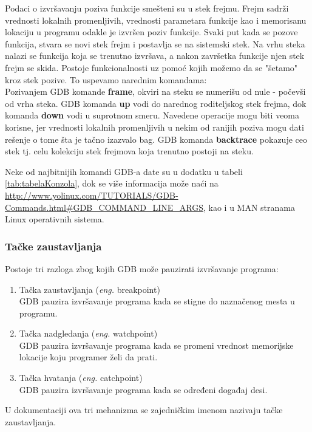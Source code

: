 \documentclass[a4paper]{article}
\begin{document}
Podaci o izvršavanju poziva funkcije smešteni su u stek frejmu. Frejm
sadrži vrednosti lokalnih promenljivih, vrednosti parametara funkcije kao
i memorisanu lokaciju u programu odakle je izvršen poziv funkcije. Svaki
put kada se pozove funkcija, stvara se novi stek frejm i postavlja se na
sistemski stek. Na vrhu steka nalazi se funkcija koja se trenutno izvršava,
a nakon završetka funkcije njen stek frejm se skida.
Postoje funkcionalnosti uz pomoć kojih možemo da se "šetamo" kroz stek pozive.
To uspevamo narednim komandama: \\
\indent Pozivanjem GDB komande \textbf{frame}, okviri na steku se numerišu od nule - počevši
od vrha steka. \newline 
\indent GDB komanda \textbf{up} vodi do narednog roditeljskog stek frejma, dok komanda \textbf{down} 
vodi u suprotnom smeru. Navedene operacije mogu biti veoma korisne, jer vrednosti lokalnih 
promenljivih u nekim od ranijih poziva mogu dati rešenje o tome šta je tačno izazvalo bag\cite{art_debugging}. 
GDB komanda \textbf{backtrace} pokazuje ceo stek tj. celu kolekciju stek frejmova koja trenutno postoji na steku.

Neke od najbitnijih komandi GDB-a date su u dodatku u tabeli \ref{tab:tabelaKonzola}, dok se više informacija
može naći na \url{http://www.yolinux.com/TUTORIALS/GDB-Commands.html\#GDB\_COMMAND\_LINE\_ARGS},
kao i u MAN stranama Linux operativnih sistema.

\subsubsection{Tačke zaustavljanja}
\label{subsec:gdbtackezaustavljanja}

Postoje tri razloga zbog kojih GDB može pauzirati izvršavanje programa:\cite{art_debugging}
\begin{enumerate}
\item Tačka zaustavljanja (\textit{eng.} breakpoint) \\
GDB pauzira izvršavanje programa kada se stigne do naznačenog mesta u programu.
\item Tačka nadgledanja (\textit{eng.} watchpoint) \\ 
GDB pauzira izvršavanje programa kada se promeni vrednost memorijske lokacije koju programer želi da prati.
\item Tačka hvatanja (\textit{eng.} catchpoint) \\
GDB pauzira izvršavanje programa kada se određeni događaj desi.
\end{enumerate}
U dokumentaciji ova tri mehanizma se zajedničkim imenom nazivaju tačke zaustavljanja. 
\end{document}
